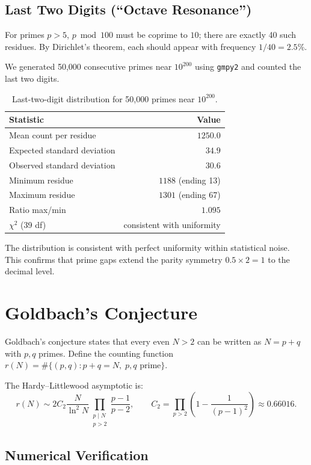 \documentclass[12pt,a4paper]{article}
\theoremstyle{plain}
\begin{document}
\subsection{Last Two Digits (``Octave Resonance'')}
\label{sec:last2}

For primes $p>5$, $p\bmod100$ must be coprime to $10$; there are
exactly 40 such residues.  By Dirichlet's theorem, each should
appear with frequency $1/40=2.5\%$.

We generated 50,000 consecutive primes near $10^{200}$ using
{\tt gmpy2} and counted the last two digits.

\begin{table}[htbp]
\centering
\caption{Last-two-digit distribution for 50,000 primes near $10^{200}$.}
\label{tab:last2}
\begin{tabular}{lr}
\hline
Statistic & Value \\
\hline
Mean count per residue & $1250.0$ \\
Expected standard deviation & $34.9$ \\
Observed standard deviation & $30.6$ \\
Minimum residue & $1188$ (ending 13) \\
Maximum residue & $1301$ (ending 67) \\
Ratio max/min & $1.095$ \\
$\chi^2$ (39 df) & consistent with uniformity \\
\hline
\end{tabular}
\end{table}

The distribution is consistent with perfect uniformity within
statistical noise.  This confirms that prime gaps
extend the parity symmetry $0.5\times2=1$ to the decimal level.

\section{Goldbach's Conjecture}
\label{sec:goldbach}

Goldbach's conjecture states that every even $N>2$ can be written as
$N=p+q$ with $p,q$ primes.  Define the counting function
$r(N)=\#\{(p,q): p+q=N,\; p,q\text{ prime}\}$.

The Hardy--Littlewood asymptotic is:
\[
r(N) \sim 2C_2 \frac{N}{\ln^2 N}
\prod_{\substack{p\mid N\\ p>2}} \frac{p-1}{p-2},
\qquad
C_2 = \prod_{p>2}\left(1-\frac1{(p-1)^2}\right)\approx0.66016.
\]

\subsection{Numerical Verification}
\end{document}

